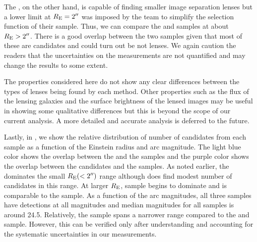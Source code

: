 \documentclass[useAMS,usenatbib,a4paper]{mn2e}
\begin{document}
The \af, on the other hand, is capable of finding smaller image
separation lenses but a lower limit at $R_{\rm E}=2\hbox{$^{\prime\prime}$}$ was imposed
by the \af team to simplify the selection function of their sample.
Thus, we can compare the \sw and \af samples at about $R_{\rm
E}>2\hbox{$^{\prime\prime}$}$. There is a good overlap between the two samples given that
most of these are candidates and could turn out be not lenses. We again
caution the readers that the uncertainties on the measurements are not
quantified and may change the results to some extent.

The properties considered here do not show any clear differences between
the types of lenses being found by each method. Other properties such as
the flux of the lensing galaxies and the surface brightness of the
lensed images may be useful in showing some qualitative differences but
this is beyond the scope of our current analysis. A more detailed and
accurate analysis is deferred to the future.

Lastly, in , we show the relative distribution of
number of candidates from each sample as a function of the Einstein
radius and arc magnitude. The light blue color shows the overlap between
the \sw and the \rf samples and the purple color shows the overlap
between the \sw candidates and the \af samples. As noted earlier, the
\rf dominates the small $R_{\rm E} (<2\hbox{$^{\prime\prime}$})$ range although \sw does
find modest number of candidates in this range. At larger $R_{\rm E}$,
\sw sample begins to dominate and is comparable to the \af sample.  As a
function of the arc magnitudes, all three samples have detections at all
magnitudes and median magnitudes for all samples is around 24.5.
Relatively, the \rf sample spans a narrower range compared to the \sw
and \af sample. However, this can be verified only after understanding
and accounting for the systematic uncertainties in our measurements.
\end{document}

